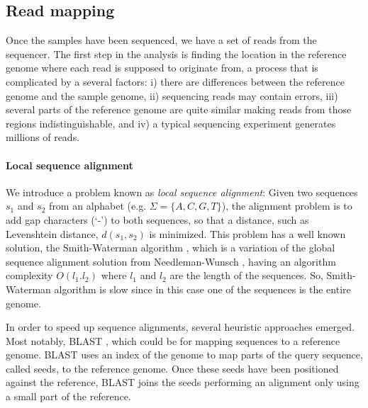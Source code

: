 \subsection{Read mapping}

Once the samples have been sequenced, we have a set of reads from the sequencer. The first step in the analysis is finding the location in the reference genome where each read is supposed to originate from, a process that is complicated by a several factors: i) there are differences between the reference genome and the sample genome, ii) sequencing reads may contain errors, iii) several parts of the reference genome are quite similar making reads from those regions indistinguishable, and iv) a typical sequencing experiment generates millions of reads.

\paragraph{Local sequence alignment} We introduce a problem known as \textit{local sequence alignment}: Given two sequences $s_1$ and $s_2$ from an alphabet (e.g. $\Sigma = \{A,C,G,T\}$), the alignment problem is to add gap characters (`-') to both sequences, so that a distance, such as Levenshtein distance, $d(s_1,s_2)$ is minimized. This problem has a well known solution, the Smith-Waterman algorithm \cite{smith1981identification}, which is a variation of the global sequence alignment solution from Needleman-Wunsch \cite{needleman1970general}, having an algorithm complexity $O(l_1 . l_2)$ where $l_1$ and $l_2$ are the length of the sequences. So, Smith-Waterman algorithm is slow since in this case one of the sequences is the entire genome.

In order to speed up sequence alignments, several heuristic approaches emerged. Most notably, BLAST \cite{altschul1990basic}, which could be for mapping sequences to a reference genome. BLAST uses an index of the genome to map parts of the query sequence, called seeds, to the reference genome. Once these seeds have been positioned against the reference, BLAST joins the seeds performing an alignment only using a small part of the reference.

